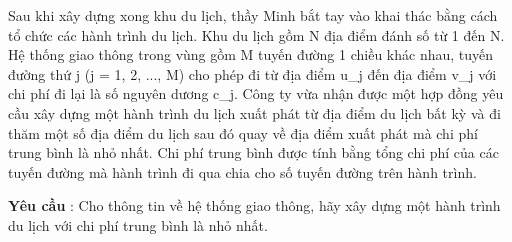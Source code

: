 Sau khi xây dựng xong khu du lịch, thầy Minh bắt tay vào khai thác bằng cách tổ chức các hành trình du lịch. Khu du lịch gồm N địa điểm đánh số từ 1 đến N. Hệ thống giao thông trong vùng gồm M tuyến đường 1 chiều khác nhau, tuyến đường thứ j (j = 1, 2, ..., M) cho phép đi từ địa điểm u\_j đến địa điểm v\_j với chi phí đi lại là số nguyên dương c\_j. Công ty vừa nhận được một hợp đồng yêu cầu xây dựng một hành trình du lịch xuất phát từ địa điểm du lịch bất kỳ và đi thăm một số địa điểm du lịch sau đó quay về địa điểm xuất phát mà chi phí trung bình là nhỏ nhất. Chi phí trung bình được tính bằng tổng chi phí của các tuyến đường mà hành trình đi qua chia cho số tuyến đường trên hành trình.  

\textbf{    Yêu cầu   }   : Cho thông tin về hệ thống giao thông, hãy xây dựng một hành trình du lịch với chi phí trung bình là nhỏ nhất.